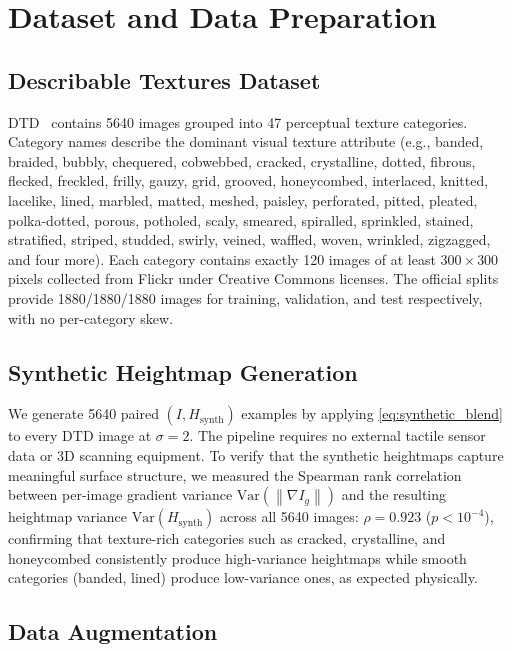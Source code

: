 \documentclass[conference]{IEEEtran}
\newcommand{\norm}[1]{\left\lVert#1\right\rVert}
\begin{document}
\section{Dataset and Data Preparation}

\subsection{Describable Textures Dataset}

DTD~\cite{b3} contains 5640 images grouped into 47 perceptual texture
categories. Category names describe the dominant visual texture attribute
(e.g., banded, braided, bubbly, chequered, cobwebbed, cracked, crystalline,
dotted, fibrous, flecked, freckled, frilly, gauzy, grid, grooved,
honeycombed, interlaced, knitted, lacelike, lined, marbled, matted,
meshed, paisley, perforated, pitted, pleated, polka-dotted, porous,
potholed, scaly, smeared, spiralled, sprinkled, stained, stratified,
striped, studded, swirly, veined, waffled, woven, wrinkled, zigzagged,
and four more). Each category contains exactly 120 images of at least
$300 \times 300$ pixels collected from Flickr under Creative Commons
licenses. The official splits provide 1880/1880/1880 images for
training, validation, and test respectively, with no per-category skew.

\subsection{Synthetic Heightmap Generation}

We generate 5640 paired $(I, H_{\text{synth}})$ examples by applying
\eqref{eq:synthetic_blend} to every DTD image at $\sigma=2$.
The pipeline requires no external tactile sensor data or 3D scanning
equipment. To verify that the synthetic heightmaps capture meaningful
surface structure, we measured the Spearman rank correlation between
per-image gradient variance $\mathrm{Var}(\norm{\nabla I_g})$ and the
resulting heightmap variance $\mathrm{Var}(H_{\text{synth}})$ across all
5640 images: $\rho = 0.923$ ($p < 10^{-4}$), confirming that
texture-rich categories such as cracked, crystalline, and honeycombed
consistently produce high-variance heightmaps while smooth categories
(banded, lined) produce low-variance ones, as expected physically.

\subsection{Data Augmentation}
\end{document}
